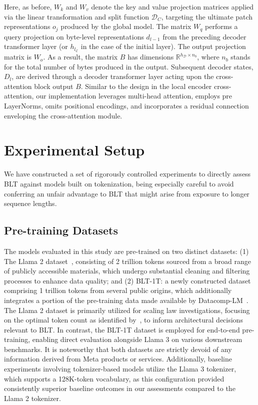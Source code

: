 Here, as before, $W_k$ and $W_v$ denote the key and value projection matrices applied via the linear transformation and split function $\mathcal{D}_C$, targeting the ultimate patch representations $o_j$ produced by the global model. The matrix $W_q$ performs a query projection on byte-level representations $d_{l-1}$ from the preceding decoder transformer layer (or $h_{l_{\mathcal{E}}}$ in the case of the initial layer). The output projection matrix is $W_o$. As a result, the matrix $B$ has dimensions $\mathbb{R}^{h_{\mathcal{D}} \times n_b}$, where $n_b$ stands for the total number of bytes produced in the output. Subsequent decoder states, $D_l$, are derived through a decoder transformer layer acting upon the cross-attention block output $B$. Similar to the design in the local encoder cross-attention, our implementation leverages multi-head attention, employs pre LayerNorms, omits positional encodings, and incorporates a residual connection enveloping the cross-attention module.

\section{Experimental Setup}
\label{section:experiments}
We have constructed a set of rigorously controlled experiments to directly assess {\textsc BLT} against models built on tokenization, being especially careful to avoid conferring an unfair advantage to {\textsc BLT} that might arise from exposure to longer sequence lengths.

\subsection{Pre-training Datasets} The models evaluated in this study are pre-trained on two distinct datasets: (1) The Llama 2 dataset~\citep{touvron2023llama}, consisting of 2 trillion tokens sourced from a broad range of publicly accessible materials, which undergo substantial cleaning and filtering processes to enhance data quality; and (2) {\textsc BLT}-1T: a newly constructed dataset comprising 1 trillion tokens from several public origins, which additionally integrates a portion of the pre-training data made available by Datacomp-LM~\citep{li2024datacomp}. The Llama 2 dataset is primarily utilized for scaling law investigations, focusing on the optimal token count as identified by~\cite{dubey2024llama}, to inform architectural decisions relevant to {\textsc BLT}. In contrast, the {\textsc BLT}-1T dataset is employed for end-to-end pre-training, enabling direct evaluation alongside Llama 3 on various downstream benchmarks. It is noteworthy that both datasets are strictly devoid of any information derived from Meta products or services. Additionally, baseline experiments involving tokenizer-based models utilize the Llama 3 tokenizer, which supports a 128K-token vocabulary, as this configuration provided consistently superior baseline outcomes in our assessments compared to the Llama 2 tokenizer.

